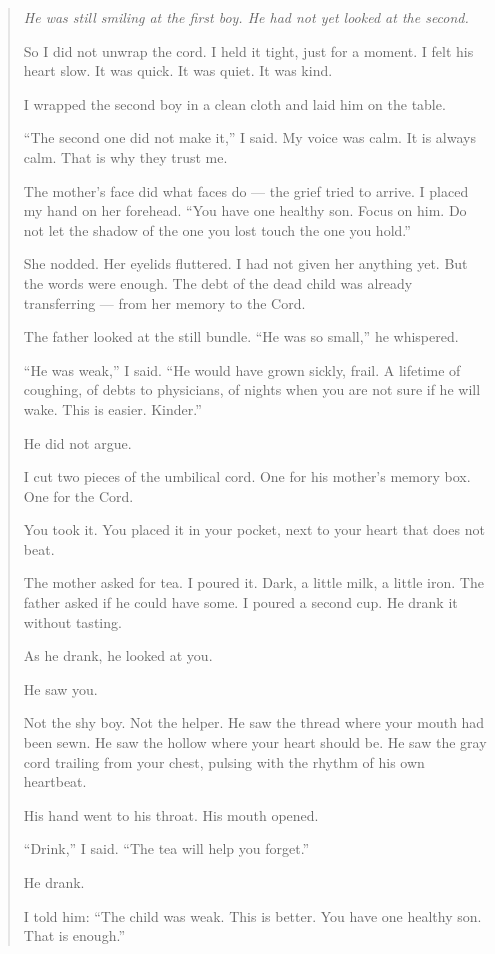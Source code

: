 \documentclass[10pt,twoside]{book}
\newenvironment{storybox}
  {\begin{quote}\itshape\small\setlength{\parskip}{0.5em}}
  {\end{quote}}
\begin{document}
\begin{storybox}
He was still smiling at the first boy. He had not yet looked at the second.

So I did not unwrap the cord. I held it tight, just for a moment. I felt his heart slow. It was quick. It was quiet. It was kind.

I wrapped the second boy in a clean cloth and laid him on the table.

``The second one did not make it,'' I said. My voice was calm. It is always calm. That is why they trust me.

The mother's face did what faces do --- the grief tried to arrive. I placed my hand on her forehead. ``You have one healthy son. Focus on him. Do not let the shadow of the one you lost touch the one you hold.''

She nodded. Her eyelids fluttered. I had not given her anything yet. But the words were enough. The debt of the dead child was already transferring --- from her memory to the Cord.

The father looked at the still bundle. ``He was so small,'' he whispered.

``He was weak,'' I said. ``He would have grown sickly, frail. A lifetime of coughing, of debts to physicians, of nights when you are not sure if he will wake. This is easier. Kinder.''

He did not argue.

I cut two pieces of the umbilical cord. One for his mother's memory box. One for the Cord.

You took it. You placed it in your pocket, next to your heart that does not beat.

The mother asked for tea. I poured it. Dark, a little milk, a little iron. The father asked if he could have some. I poured a second cup. He drank it without tasting.

As he drank, he looked at you.

He saw you.

Not the shy boy. Not the helper. He saw the thread where your mouth had been sewn. He saw the hollow where your heart should be. He saw the gray cord trailing from your chest, pulsing with the rhythm of his own heartbeat.

His hand went to his throat. His mouth opened.

``Drink,'' I said. ``The tea will help you forget.''

He drank.

I told him: ``The child was weak. This is better. You have one healthy son. That is enough.''


\end{storybox}
\end{document}
